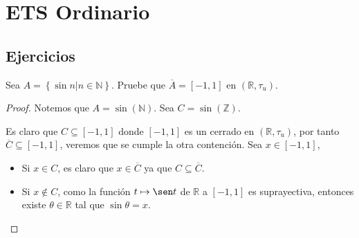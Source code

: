 \documentclass[12pt]{report}
\theoremstyle{largebreak}
\newcommand\Cls[1]{\ensuremath{\overline{#1}}}
\begin{document}
    \chapter{ETS Ordinario}

    \section{Ejercicios}

    \begin{excer}
        Sea $A=\left\{\sin n\Big|n\in\mathbb{N} \right\}$. Pruebe que $\Cls{A}=[-1,1]$ en $(\mathbb{R},\tau_u)$.
    \end{excer}

    \begin{proof}
        Notemos que $A=\sin(\mathbb{N})$. Sea $C=\sin(\mathbb{Z})$.

        Es claro que $C\subseteq[-1,1]$ donde $[-1,1]$ es un cerrado en $(\mathbb{R},\tau_u)$, por tanto $\Cls{C}\subseteq[-1,1]$, veremos que se cumple la otra contención. Sea $x\in[-1,1]$,
        \begin{itemize}
            \item Si $x\in C$,  es claro que $x\in\Cls{C}$ ya que $C\subseteq\Cls{C}$.
            \item Si $x\notin C$, como la función $t\mapsto\sen t$ de $\mathbb{R}$ a $[-1,1]$ es suprayectiva, entonces existe $\theta\in\mathbb{R}$ tal que $\sin\theta=x$.
            

\end{itemize}
\end{proof}
\end{document}
